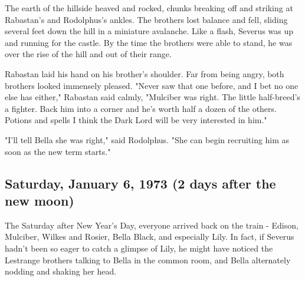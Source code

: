 The earth of the hillside heaved and rocked, chunks breaking off and striking at Rabastan's and Rodolphus's ankles. The brothers lost balance and fell, sliding several feet down the hill in a miniature avalanche. Like a flash, Severus was up and running for the castle. By the time the brothers were able to stand, he was over the rise of the hill and out of their range.

Rabastan laid his hand on his brother's shoulder. Far from being angry, both brothers looked immensely pleased. "Never saw that one before, and I bet no one else has either," Rabastan said calmly, "Mulciber was right. The little half-breed's a fighter. Back him into a corner and he's worth half a dozen of the others. Potions and spells{\el} I think the Dark Lord will be very interested in him."

"I'll tell Bella she was right," said Rodolphus. "She can begin recruiting him as soon as the new term starts."

\subsection{Saturday, January 6, 1973 (2 days after the new moon)}

The Saturday after New Year's Day, everyone arrived back on the train - Edison, Mulciber, Wilkes and Rosier, Bella Black, and especially Lily. In fact, if Severus hadn't been so eager to catch a glimpse of Lily, he might have noticed the Lestrange brothers talking to Bella in the common room, and Bella alternately nodding and shaking her head.


